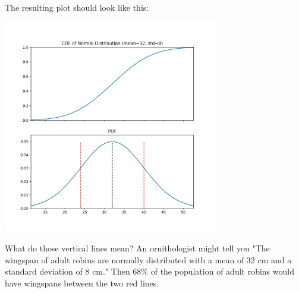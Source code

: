 The resulting plot should look like this:

\includegraphics[width=0.7\textwidth]{norm_32_8.png}

What do those vertical lines mean?  An ornithologist might tell you "The wingspan of adult robins are normally distributed with a mean of 32 cm and a
 standard deviation of 8 cm."  Then 68\% of the population of adult robins would have wingspans between the two red lines.